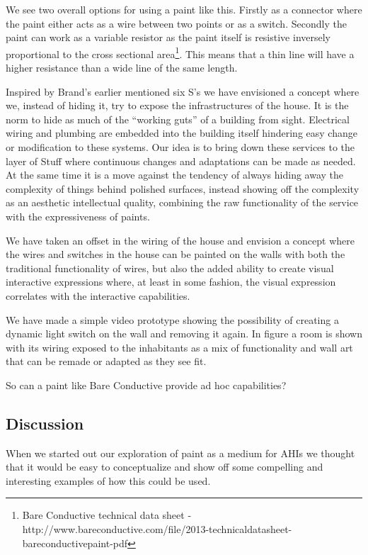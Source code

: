 We see two overall options for using a paint like this.
Firstly as a connector where the paint either acts as a wire between two points or as a switch.
Secondly the paint can work as a variable resistor as the paint itself is resistive inversely proportional to the cross sectional area\footnote{Bare Conductive technical data sheet - http://www.bareconductive.com/file/2013-technicaldatasheet-bareconductivepaint-pdf}. 
This means that a thin line will have a higher resistance than a wide line of the same length. 

Inspired by Brand's earlier mentioned six S's \citep{brand1995buildings} we have envisioned a concept where we, instead of hiding it, try to expose the infrastructures of the house.
It is the norm to hide as much of the ``working guts'' of a building from sight.
Electrical wiring and plumbing are embedded into the building itself hindering easy change or modification to these systems.
Our idea is to bring down these services to the layer of Stuff where continuous changes and adaptations can be made as needed.
At the same time it is a move against the tendency of always hiding away the complexity of things behind polished surfaces, instead showing off the complexity as an aesthetic intellectual quality, combining the raw functionality of the service with the expressiveness of paints.

We have taken an offset in the wiring of the house and envision a concept where the wires and switches in the house can be painted on the walls with both the traditional functionality of wires, but also the added ability to create visual interactive expressions where, at least in some fashion, the visual expression correlates with the interactive capabilities.

We have made a simple video prototype showing the possibility of creating a dynamic light switch on the wall and removing it again.
In figure  a room is shown with its wiring exposed to the inhabitants as a mix of functionality and wall art that can be remade or adapted as they see fit.

So can a paint like Bare Conductive provide ad hoc capabilities?

\subsection{Discussion}
When we started out our exploration of paint as a medium for AHIs we thought that it would be easy to conceptualize and show off some compelling and interesting examples of how this could be used.

